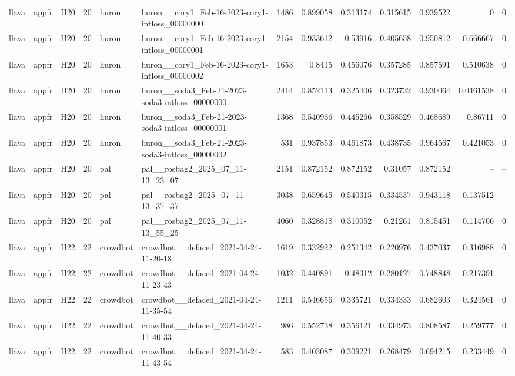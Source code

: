 \begin{longtable}{lllrllrrrrrrr}
llava & appfr & H20 & 20 & huron & huron\_\_cory1\_Feb-16-2023-cory1-intloss\_00000000 & 1486 & 0.899058 & 0.313174 & 0.315615 & 0.939522 & 0 & 0 \\
llava & appfr & H20 & 20 & huron & huron\_\_cory1\_Feb-16-2023-cory1-intloss\_00000001 & 2154 & 0.933612 & 0.53916 & 0.405658 & 0.950812 & 0.666667 & 0 \\
llava & appfr & H20 & 20 & huron & huron\_\_cory1\_Feb-16-2023-cory1-intloss\_00000002 & 1653 & 0.8415 & 0.456076 & 0.357285 & 0.857591 & 0.510638 & 0 \\
llava & appfr & H20 & 20 & huron & huron\_\_soda3\_Feb-21-2023-soda3-intloss\_00000000 & 2414 & 0.852113 & 0.325406 & 0.323732 & 0.930064 & 0.0461538 & 0 \\
llava & appfr & H20 & 20 & huron & huron\_\_soda3\_Feb-21-2023-soda3-intloss\_00000001 & 1368 & 0.540936 & 0.445266 & 0.358529 & 0.468689 & 0.86711 & 0 \\
llava & appfr & H20 & 20 & huron & huron\_\_soda3\_Feb-21-2023-soda3-intloss\_00000002 & 531 & 0.937853 & 0.461873 & 0.438735 & 0.964567 & 0.421053 & 0 \\
llava & appfr & H20 & 20 & pal & pal\_\_rosbag2\_2025\_07\_11-13\_23\_07 & 2151 & 0.872152 & 0.872152 & 0.31057 & 0.872152 & -- & -- \\
llava & appfr & H20 & 20 & pal & pal\_\_rosbag2\_2025\_07\_11-13\_37\_37 & 3038 & 0.659645 & 0.540315 & 0.334537 & 0.943118 & 0.137512 & -- \\
llava & appfr & H20 & 20 & pal & pal\_\_rosbag2\_2025\_07\_11-13\_55\_25 & 4060 & 0.328818 & 0.310052 & 0.21261 & 0.815451 & 0.114706 & 0 \\
llava & appfr & H22 & 22 & crowdbot & crowdbot\_\_defaced\_2021-04-24-11-20-18 & 1619 & 0.332922 & 0.251342 & 0.220976 & 0.437037 & 0.316988 & 0 \\
llava & appfr & H22 & 22 & crowdbot & crowdbot\_\_defaced\_2021-04-24-11-23-43 & 1032 & 0.440891 & 0.48312 & 0.280127 & 0.748848 & 0.217391 & -- \\
llava & appfr & H22 & 22 & crowdbot & crowdbot\_\_defaced\_2021-04-24-11-35-54 & 1211 & 0.546656 & 0.335721 & 0.334333 & 0.682603 & 0.324561 & 0 \\
llava & appfr & H22 & 22 & crowdbot & crowdbot\_\_defaced\_2021-04-24-11-40-33 & 986 & 0.552738 & 0.356121 & 0.334973 & 0.808587 & 0.259777 & 0 \\
llava & appfr & H22 & 22 & crowdbot & crowdbot\_\_defaced\_2021-04-24-11-43-54 & 583 & 0.403087 & 0.309221 & 0.268479 & 0.694215 & 0.233449 & 0 \\

\end{longtable}
